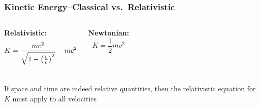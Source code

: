 \documentclass[12pt,compress,aspectratio=169]{beamer}
\newcommand{\bigsqrt}{\ensuremath\sqrt{1-\left(\frac{v}{c}\right)^2}}
\newcommand{\eq}[2]{\vspace{#1}{\Large\begin{displaymath}#2\end{displaymath}}}
\begin{document}
%
%
%
%
%
%
%
%
%
%
%



\begin{frame}
  \frametitle{Kinetic Energy--Classical vs.\ Relativistic}
  \begin{columns}
    \textbf{Relativistic:}
    {\Large
      \begin{displaymath}
        K=\frac{mc^2}{\bigsqrt}-mc^2
      \end{displaymath}
    }
    
    \textbf{Newtonian:}
    {\Large
      \begin{displaymath}
        K=\frac{1}{2}mv^2
      \end{displaymath}
    }
  \end{columns}
  If space and time are indeed relative quantities, then the relativistic
  equation for $K$ must apply to all velocities
\end{frame}
\end{document}
